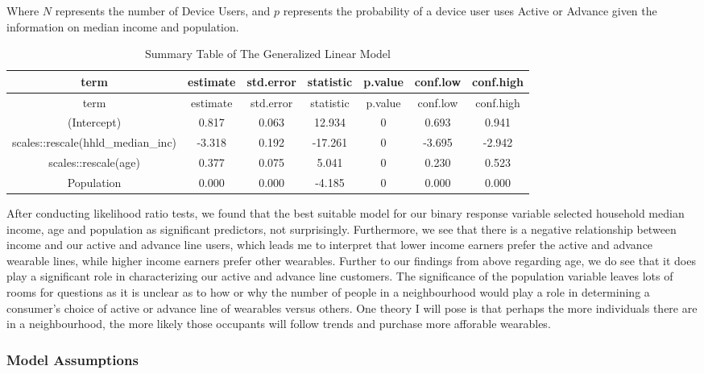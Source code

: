 \documentclass[
          english,
          paper=a4,
              ,captions=tableheading
  ]{scrartcl}
\begin{document}
Where \(N\) represents the number of Device Users, and \(p\) represents
the probability of a device user uses Active or Advance given the
information on median income and population.

\begin{longtable}[]{@{}ccccccc@{}}
\caption{Summary Table of The Generalized Linear Model}\tabularnewline
\toprule
term & estimate & std.error & statistic & p.value & conf.low &
conf.high \\
\midrule
\endfirsthead
\toprule
term & estimate & std.error & statistic & p.value & conf.low &
conf.high \\
\midrule
\endhead
(Intercept) & 0.817 & 0.063 & 12.934 & 0 & 0.693 & 0.941 \\
scales::rescale(hhld\_median\_inc) & -3.318 & 0.192 & -17.261 & 0 &
-3.695 & -2.942 \\
scales::rescale(age) & 0.377 & 0.075 & 5.041 & 0 & 0.230 & 0.523 \\
Population & 0.000 & 0.000 & -4.185 & 0 & 0.000 & 0.000 \\
\bottomrule
\end{longtable}

After conducting likelihood ratio tests, we found that the best suitable
model for our binary response variable selected household median income,
age and population as significant predictors, not surprisingly.
Furthermore, we see that there is a negative relationship between income
and our active and advance line users, which leads me to interpret that
lower income earners prefer the active and advance wearable lines, while
higher income earners prefer other wearables. Further to our findings
from above regarding age, we do see that it does play a significant role
in characterizing our active and advance line customers. The
significance of the population variable leaves lots of rooms for
questions as it is unclear as to how or why the number of people in a
neighbourhood would play a role in determining a consumer's choice of
active or advance line of wearables versus others. One theory I will
pose is that perhaps the more individuals there are in a neighbourhood,
the more likely those occupants will follow trends and purchase more
afforable wearables.

\hypertarget{model-assumptions}{%
\subsubsection{Model Assumptions}\label{model-assumptions}}
\end{document}
